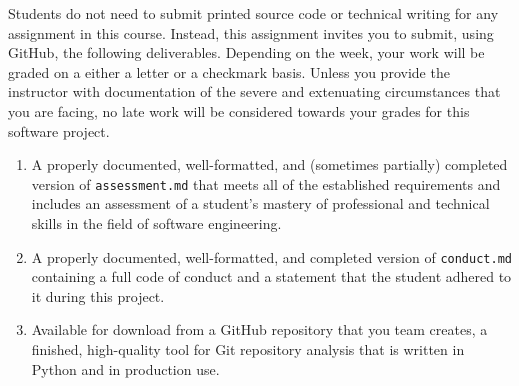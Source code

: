 \documentclass[11pt]{article}
\newcommand{\assessment}{\lstinline{assessment.md}}
\newcommand{\conduct}{\lstinline{conduct.md}}
\begin{document}
\noindent Students do not need to submit printed source code or technical
writing for any assignment in this course. Instead, this assignment invites you
to submit, using GitHub, the following deliverables. Depending on the week, your
work will be graded on a either a letter or a checkmark basis.
%
Unless you provide the instructor with documentation of the severe and
extenuating circumstances that you are facing, no late work will be considered
towards your grades for this software project.

\vspace*{-.25em}

\begin{enumerate}

\setlength{\itemsep}{0in}

\item A properly documented, well-formatted, and (sometimes partially) completed
  version of \assessment{} that meets all of the established requirements and
  includes an assessment of a student's mastery of professional and technical
  skills in the field of software engineering.

\item A properly documented, well-formatted, and completed version of \conduct{}
  containing a full code of conduct and a statement that the student adhered to
  it during this project.

\item Available for download from a GitHub repository that you team creates, a
  finished, high-quality tool for Git repository analysis that is written in
  Python and in production use.

\end{enumerate}
\end{document}
